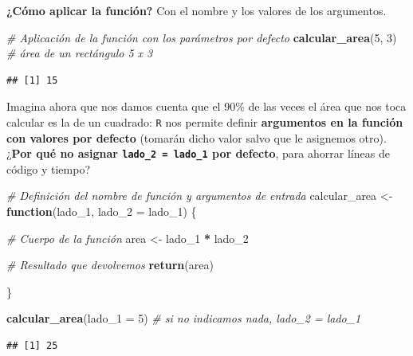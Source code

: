 \documentclass[11pt,]{book}
\newenvironment{Shaded}{\begin{snugshade}}{\end{snugshade}}
\newcommand{\CommentTok}[1]{\textcolor[rgb]{0.37,0.37,0.37}{\textit{#1}}}
\newcommand{\ControlFlowTok}[1]{\textcolor[rgb]{0.27,0.27,0.27}{\textbf{#1}}}
\newcommand{\DataTypeTok}[1]{\textcolor[rgb]{0.27,0.27,0.27}{#1}}
\newcommand{\DecValTok}[1]{\textcolor[rgb]{0.06,0.06,0.06}{#1}}
\newcommand{\KeywordTok}[1]{\textcolor[rgb]{0.27,0.27,0.27}{\textbf{#1}}}
\newcommand{\NormalTok}[1]{#1}
\newcommand{\OperatorTok}[1]{\textcolor[rgb]{0.43,0.43,0.43}{\textbf{#1}}}
\newcommand{\StringTok}[1]{\textcolor[rgb]{0.5,0.5,0.5}{#1}}
\begin{document}
\textbf{¿Cómo aplicar la función?} Con el nombre y los valores de los argumentos.

\begin{Shaded}
\begin{Highlighting}[]
\CommentTok{# Aplicación de la función con los parámetros por defecto}
\KeywordTok{calcular_area}\NormalTok{(}\DecValTok{5}\NormalTok{, }\DecValTok{3}\NormalTok{) }\CommentTok{# área de un rectángulo 5 x 3 }
\end{Highlighting}
\end{Shaded}

\begin{verbatim}
## [1] 15
\end{verbatim}

Imagina ahora que nos damos cuenta que el 90\% de las veces el área que nos toca calcular es la de un cuadrado: \texttt{R} nos permite definir \textbf{argumentos en la función con valores por defecto} (tomarán dicho valor salvo que le asignemos otro). ¿\textbf{Por qué no asignar \texttt{lado\_2\ =\ lado\_1} por defecto}, para ahorrar líneas de código y tiempo?

\begin{Shaded}
\begin{Highlighting}[]
\CommentTok{# Definición del nombre de función y argumentos de entrada}
\NormalTok{calcular_area <-}\StringTok{ }\ControlFlowTok{function}\NormalTok{(lado_}\DecValTok{1}\NormalTok{, }\DataTypeTok{lado_2 =}\NormalTok{ lado_}\DecValTok{1}\NormalTok{) \{}
  
  \CommentTok{# Cuerpo de la función}
\NormalTok{  area <-}\StringTok{ }\NormalTok{lado_}\DecValTok{1} \OperatorTok{*}\StringTok{ }\NormalTok{lado_}\DecValTok{2}
  
  \CommentTok{# Resultado que devolvemos}
  \KeywordTok{return}\NormalTok{(area)}
  
\NormalTok{\}}
\end{Highlighting}
\end{Shaded}

\begin{Shaded}
\begin{Highlighting}[]
\KeywordTok{calcular_area}\NormalTok{(}\DataTypeTok{lado_1 =} \DecValTok{5}\NormalTok{) }\CommentTok{# si no indicamos nada, lado_2 = lado_1}
\end{Highlighting}
\end{Shaded}

\begin{verbatim}
## [1] 25
\end{verbatim}
\end{document}
